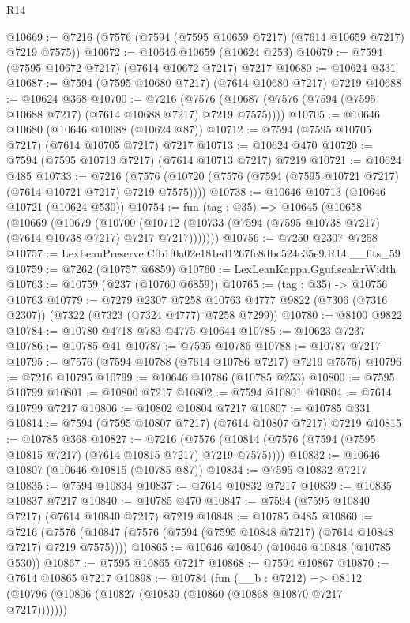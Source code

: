\begin{lexlean}{R14}
\begin{coremodule}
@10669 := @7216 (@7576 (@7594 (@7595 @10659 @7217) (@7614 @10659 @7217) @7219 @7575))
@10672 := @10646 @10659 (@10624 @253)
@10679 := @7594 (@7595 @10672 @7217) (@7614 @10672 @7217) @7217
@10680 := @10624 @331
@10687 := @7594 (@7595 @10680 @7217) (@7614 @10680 @7217) @7219
@10688 := @10624 @368
@10700 := @7216
    (@7576 (@10687 (@7576 (@7594 (@7595 @10688 @7217) (@7614 @10688 @7217) @7219 @7575))))
@10705 := @10646 @10680 (@10646 @10688 (@10624 @87))
@10712 := @7594 (@7595 @10705 @7217) (@7614 @10705 @7217) @7217
@10713 := @10624 @470
@10720 := @7594 (@7595 @10713 @7217) (@7614 @10713 @7217) @7219
@10721 := @10624 @485
@10733 := @7216
    (@7576 (@10720 (@7576 (@7594 (@7595 @10721 @7217) (@7614 @10721 @7217) @7219 @7575))))
@10738 := @10646 @10713 (@10646 @10721 (@10624 @530))
@10754 := fun (tag : @35) =>
  @10645
    (@10658
      (@10669
        (@10679
          (@10700
            (@10712 (@10733 (@7594 (@7595 @10738 @7217) (@7614 @10738 @7217) @7217 @7217)))))))
@10756 := @7250 @2307 @7258
@10757 := LexLeanPreserve.Cfb1f0a02e181ed1267fc8dbc524c35e9.R14.__fits_59
@10759 := @7262 (@10757 @6859)
@10760 := LexLeanKappa.Gguf.scalarWidth
@10763 := @10759 (@237 (@10760 @6859))
@10765 := (tag : @35) -> @10756 @10763
@10779 := @7279
    @2307
    @7258
    @10763
    @4777
    @9822
    (@7306 (@7316 @2307))
    (@7322 (@7323 (@7324 @4777) @7258 @7299))
@10780 := @8100 @9822
@10784 := @10780 @4718 @783 @4775 @10644
@10785 := @10623 @7237
@10786 := @10785 @41
@10787 := @7595 @10786
@10788 := @10787 @7217
@10795 := @7576 (@7594 @10788 (@7614 @10786 @7217) @7219 @7575)
@10796 := @7216 @10795
@10799 := @10646 @10786 (@10785 @253)
@10800 := @7595 @10799
@10801 := @10800 @7217
@10802 := @7594 @10801
@10804 := @7614 @10799 @7217
@10806 := @10802 @10804 @7217
@10807 := @10785 @331
@10814 := @7594 (@7595 @10807 @7217) (@7614 @10807 @7217) @7219
@10815 := @10785 @368
@10827 := @7216
    (@7576 (@10814 (@7576 (@7594 (@7595 @10815 @7217) (@7614 @10815 @7217) @7219 @7575))))
@10832 := @10646 @10807 (@10646 @10815 (@10785 @87))
@10834 := @7595 @10832 @7217
@10835 := @7594 @10834
@10837 := @7614 @10832 @7217
@10839 := @10835 @10837 @7217
@10840 := @10785 @470
@10847 := @7594 (@7595 @10840 @7217) (@7614 @10840 @7217) @7219
@10848 := @10785 @485
@10860 := @7216
    (@7576 (@10847 (@7576 (@7594 (@7595 @10848 @7217) (@7614 @10848 @7217) @7219 @7575))))
@10865 := @10646 @10840 (@10646 @10848 (@10785 @530))
@10867 := @7595 @10865 @7217
@10868 := @7594 @10867
@10870 := @7614 @10865 @7217
@10898 := @10784
    (fun (__b : @7212) =>
    @8112 (@10796 (@10806 (@10827 (@10839 (@10860 (@10868 @10870 @7217 @7217)))))))

\end{coremodule}
\end{lexlean}
